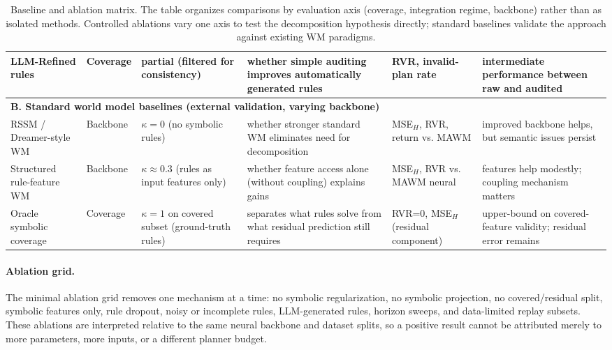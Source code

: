 \documentclass{article}
\theoremstyle{plain}
\theoremstyle{definition}
\theoremstyle{remark}
\begin{document}
\begin{table}[t]
{\begin{tabular}{p{2.9cm}p{1.0cm}p{2.8cm}p{3.4cm}p{2.8cm}p{2.4cm}}
      LLM-Refined rules          & Coverage      & partial (filtered for consistency)                  & whether simple auditing improves automatically generated rules          & RVR, invalid-plan rate                     & intermediate performance between raw and audited                \\
      \midrule
      \multicolumn{6}{l}{\textbf{B. Standard world model baselines (external validation, varying backbone)}}                                                                                                                                                                                                 \\
      \midrule
      RSSM / Dreamer-style WM    & Backbone      & $\kappa=0$ (no symbolic rules)                      & whether stronger standard WM eliminates need for decomposition          & MSE$_H$, RVR, return vs. MAWM                           & improved backbone helps, but semantic issues persist            \\
      Structured rule-feature WM & Backbone      & $\kappa \approx 0.3$ (rules as input features only) & whether feature access alone (without coupling) explains gains          & MSE$_H$, RVR vs. MAWM neural                            & features help modestly; coupling mechanism matters              \\
      Oracle symbolic coverage   & Coverage      & $\kappa=1$ on covered subset (ground-truth rules)   & separates what rules solve from what residual prediction still requires & RVR=0, MSE$_H$ (residual component)                    & upper-bound on covered-feature validity; residual error remains \\
      \bottomrule
    \end{tabular}
  }
  \caption{Baseline and ablation matrix. The table organizes comparisons by evaluation axis (coverage, integration regime, backbone) rather than as isolated methods. Controlled ablations vary one axis to test the decomposition hypothesis directly; standard baselines validate the approach against existing WM paradigms.}
  \label{tab:baselines_structured}
\end{table}

\paragraph{Ablation grid.}
The minimal ablation grid removes one mechanism at a time: no symbolic regularization, no symbolic projection, no covered/residual split, symbolic features only, rule dropout, noisy or incomplete rules, LLM-generated rules, horizon sweeps, and data-limited replay subsets. These ablations are interpreted relative to the same neural backbone and dataset splits, so a positive result cannot be attributed merely to more parameters, more inputs, or a different planner budget.
\end{document}

